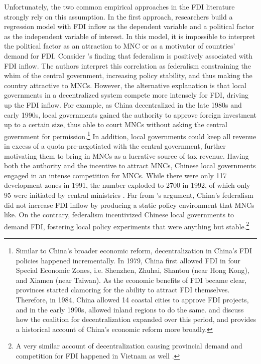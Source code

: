 Unfortunately, the two common empirical approaches in the FDI literature
strongly rely on this assumption. In the first approach, researchers build a
regression model with FDI inflow as the dependent variable and a political
factor as the independent variable of interest. In this model, it is impossible
to interpret the political factor as an attraction to MNC or as a motivator of
countries' demand for FDI. Consider \citet{Jensen2005}'s finding that federalism
is positively associated with FDI inflow. The authors interpret this correlation
as federalism constraining the whim of the central government, increasing policy
stability, and thus making the country attractive to MNCs. However, the
alternative explanation is that local governments in a decentralized system
compete more intensely for FDI, driving up the FDI inflow. For example, as China
decentralized in the late 1980s and early 1990s, local governments gained the
authority to approve foreign investment up to a certain size, thus able to court
MNCs without asking the central government for permission.\footnote{Similar to
  China's broader economic reform, decentralization in China's FDI policies
  happened incrementally. In 1979, China first allowed FDI in four Special
  Economic Zones, i.e. Shenzhen, Zhuhai, Shantou (near Hong Kong), and Xiamen
  (near Taiwan). As the economic benefits of FDI became clear, provinces started
  clamoring for the ability to attract FDI themselves. Therefore, in 1984, China
  allowed 14 coastal cities to approve FDI projects, and in the early 1990s,
  allowed inland regions to do the same. \citet{Gallagher2002} and
  \citet{Shirk1993} discuss how the coalition for decentralization expanded over
  this period, and \citet{Coase2012} provides a historical account of China's
  economic reform more broadly.} In addition, local governments could keep all
revenue in excess of a quota pre-negotiated with the central government, further
motivating them to bring in MNCs as a lucrative source of tax revenue. Having
both the authority and the incentive to attract MNCs, Chinese local governments
engaged in an intense competition for MNCs. While there were only
117 development zones in 1991, the number exploded to 2700 in 1992, of which
only 95 were initiated by central ministries \citep{Montinola1995}. Far from
\citet{Jensen2005}'s argument, China's federalism did not increase FDI inflow by
producing a static policy environment that MNCs like. On the contrary,
federalism incentivized Chinese local governments to demand FDI, fostering local
policy experiments that were anything but stable.\footnote{A very similar
  account of decentralization causing provincial demand and competition for FDI
  happened in Vietnam as well \citep{Malesky2004c}.}

